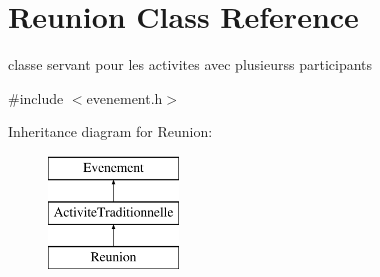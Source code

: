\hypertarget{class_reunion}{}\section{Reunion Class Reference}
\label{class_reunion}


classe servant pour les activites avec plusieurss participants  




{\ttfamily \#include $<$evenement.\+h$>$}

Inheritance diagram for Reunion\+:\begin{figure}[H]
\begin{center}
\leavevmode
\includegraphics[height=3.000000cm]{class_reunion}
\end{center}
\end{figure}
